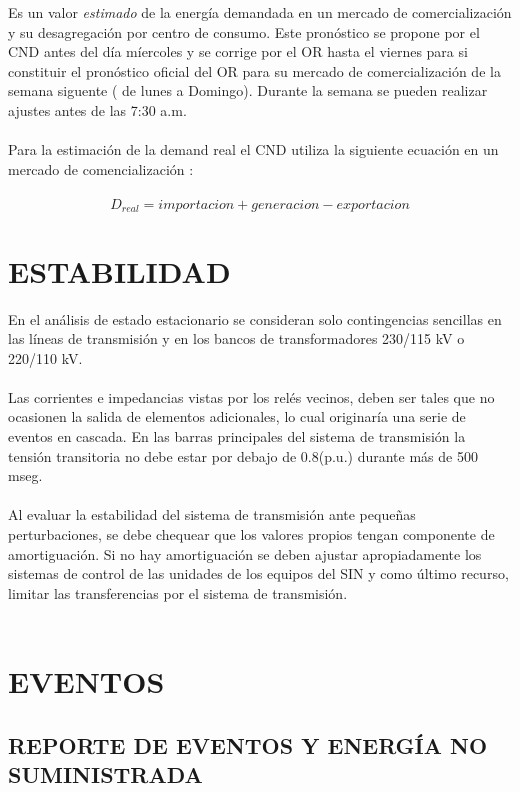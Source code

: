 \documentclass[a5paper]{book}%
\begin{document}
Es un valor \textit{estimado} de la energía demandada en un mercado de
comercialización y su desagregación por centro de consumo. Este
pronóstico se propone por el CND antes del día míercoles y se corrige
por el OR hasta el viernes para si constituir el pronóstico oficial
del OR para su mercado de comercialización de la semana siguente ( de
lunes a Domingo). Durante la semana se pueden realizar ajustes antes
de las 7:30 a.m.\\\\
Para la estimación de la demand real el CND utiliza la siguiente
ecuación en un mercado de comencialización :\\\\
\[D_{real} = importacion + generacion - exportacion \]




\chapter{ESTABILIDAD}
 En el análisis de estado estacionario se consideran solo
  contingencias sencillas en las líneas de transmisión y en los bancos
  de transformadores 230/115 kV o 220/110 kV.\\\\
	
	
 Las corrientes e impedancias vistas por los relés vecinos, deben
  ser tales que no ocasionen la salida de elementos adicionales, lo
  cual originaría una serie de eventos en cascada.  En las barras
  principales del sistema de transmisión la tensión transitoria no
  debe estar por debajo de 0.8(p.u.) durante más de 500 mseg.\\\\
	
 Al evaluar la estabilidad del sistema de transmisión ante
  pequeñas perturbaciones, se debe chequear que los valores propios
  tengan componente de amortiguación. Si no hay amortiguación se deben
  ajustar apropiadamente los sistemas de control de las unidades de
  los equipos del SIN y como último recurso, limitar las
  transferencias por el sistema de transmisión.\\\\


                          \chapter{EVENTOS}

\section{REPORTE DE EVENTOS Y ENERGÍA NO SUMINISTRADA}
\end{document}
